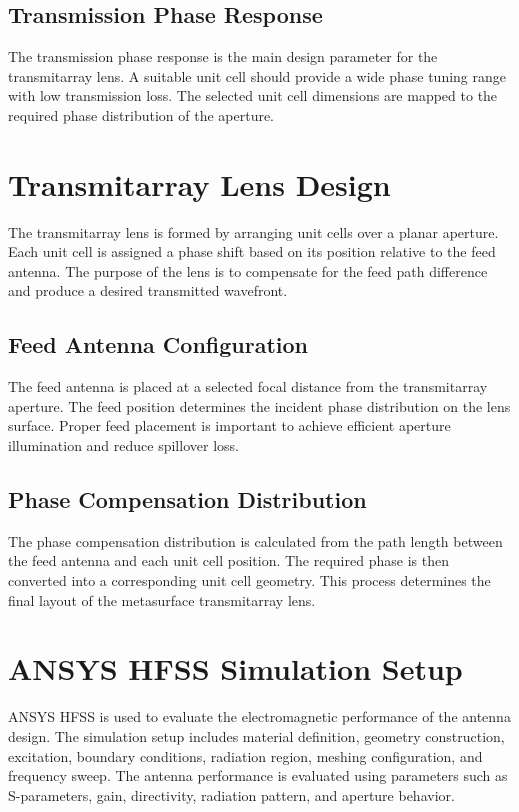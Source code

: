 \subsection{Transmission Phase Response}
The transmission phase response is the main design parameter for the transmitarray lens. A suitable unit cell should provide a wide phase tuning range with low transmission loss. The selected unit cell dimensions are mapped to the required phase distribution of the aperture.

\section{Transmitarray Lens Design}
The transmitarray lens is formed by arranging unit cells over a planar aperture. Each unit cell is assigned a phase shift based on its position relative to the feed antenna. The purpose of the lens is to compensate for the feed path difference and produce a desired transmitted wavefront.

\subsection{Feed Antenna Configuration}
The feed antenna is placed at a selected focal distance from the transmitarray aperture. The feed position determines the incident phase distribution on the lens surface. Proper feed placement is important to achieve efficient aperture illumination and reduce spillover loss.

\subsection{Phase Compensation Distribution}
The phase compensation distribution is calculated from the path length between the feed antenna and each unit cell position. The required phase is then converted into a corresponding unit cell geometry. This process determines the final layout of the metasurface transmitarray lens.

\section{ANSYS HFSS Simulation Setup}
ANSYS HFSS is used to evaluate the electromagnetic performance of the antenna design. The simulation setup includes material definition, geometry construction, excitation, boundary conditions, radiation region, meshing configuration, and frequency sweep. The antenna performance is evaluated using parameters such as S-parameters, gain, directivity, radiation pattern, and aperture behavior.

